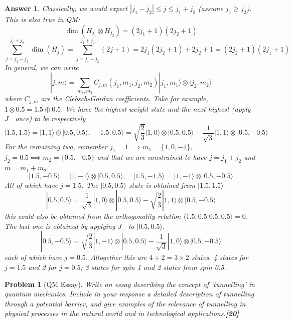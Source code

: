 \documentclass[a4paper]{article}
\newtheorem{ans}{Answer}[subsection]
\theoremstyle{new}
\newtheorem{qns}{Problem}[subsection]
\begin{document}
\begin{ans}
Classically, we would expect $|j_1-j_2|\leq j\leq j_1+j_2$ (assume $j_1\geq j_2$). This is also true in QM: 
$$\dim(H_{j_1}\otimes H_{j_2})=(2j_1+1)(2j_2+1)$$
$$\sum_{j=j_1-j_2}^{j_1+j_2}\dim(H_j)=\sum_{j=j_1-j_2}^{j_1+j_2}(2j+1)=2j_1(2j_2+1)+2j_2+1=(2j_2+1)(2j_1+1)$$
In general, we can write 
$$|j,m\rangle=\sum_{m_1,m_2}C_{j,m}(j_1,m_1;j_2,m_2)|j_1,m_1\rangle\otimes|j_2,m_2\rangle$$
where $C_{j,m}$ are the Clebsch-Gordan coefficients.
Take for example, $1\otimes0.5=1.5\oplus0.5$. 
We have the highest weight state and the next highest (apply $J_-$ once) to be respectively
$$|1.5,1.5\rangle=|1,1\rangle\otimes|0.5,0.5\rangle,\quad|1.5,0.5\rangle=\sqrt{\frac{2}{3}}|1,0\rangle\otimes|0.5,0.5\rangle+\frac{1}{\sqrt{3}}|1,1\rangle\otimes|0.5,-0.5\rangle$$
For the remaining two, remember $j_1=1\implies m_1=\{1,0,-1\}$, $j_2=0.5\implies m_2=\{0.5,-0.5\}$ and that we are constrained to have $j=j_1+j_2$ and $m=m_1+m_2$.
$$|1.5,-0.5\rangle=|1,-1\rangle\otimes|0.5,0.5\rangle,\quad|1.5,-1.5\rangle=|1,-1\rangle\otimes|0.5,-0.5\rangle$$
All of which have $j=1.5$. The $|0.5,0.5\rangle$ state is obtained from $|1.5,1.5\rangle$
$$|0.5,0.5\rangle=\frac{1}{\sqrt{3}}|1,0\rangle\otimes|0.5,0.5\rangle-\sqrt{\frac{2}{3}}|1,1\rangle\otimes|0.5,-0.5\rangle$$
this could also be obtained from the orthogonality relation $\langle1.5,0.5|0.5,0.5\rangle=0$. The last one is obtained by applying $J_-$ to $|0.5,0.5\rangle$.
$$|0.5,-0.5\rangle=\sqrt{\frac{2}{3}}|1,-1\rangle\otimes|0.5,0.5\rangle-\frac{1}{\sqrt{3}}|1,0\rangle\otimes|0.5,-0.5\rangle$$
each of which have $j=0.5$. Altogether this are $4+2=3\times 2$ states. 4 states for $j=1.5$ and 2 for $j=0.5$; 3 states for spin 1 and 2 states from spin 0.5.
\end{ans}
\newpage
\begin{qns}[QM Essay]
Write an essay describing the concept of ‘tunnelling’ in quantum mechanics. Include in your response a detailed description of tunnelling through a potential barrier, and give examples of the relevance of tunnelling in physical processes in the natural world and in technological applications.\hfill\textbf{[20]}
\end{qns}
\end{document}
